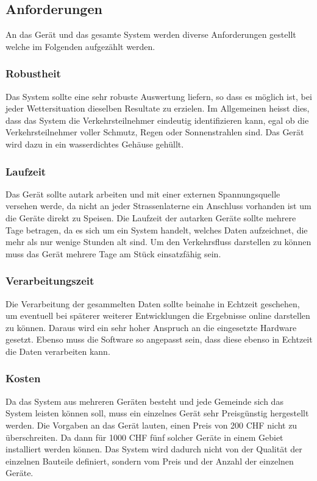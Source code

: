 \subsection{Anforderungen}
An das Gerät und das gesamte System werden diverse Anforderungen gestellt welche im Folgenden aufgezählt werden.

\subsubsection{Robustheit}
Das System sollte eine sehr robuste Auswertung liefern, so dass es möglich ist, bei jeder Wettersituation dieselben Resultate zu erzielen. Im Allgemeinen heisst dies, dass das System die Verkehrsteilnehmer eindeutig identifizieren kann, egal ob die Verkehrsteilnehmer voller Schmutz, Regen oder Sonnenstrahlen sind. Das Gerät wird dazu in ein wasserdichtes Gehäuse gehüllt. 

\subsubsection{Laufzeit}
Das Gerät sollte autark arbeiten und mit einer externen Spannungsquelle versehen werde, da nicht an jeder Strassenlaterne ein Anschluss vorhanden ist um die Geräte direkt zu Speisen. Die Laufzeit der autarken Geräte sollte mehrere Tage betragen, da es sich um ein System handelt, welches Daten aufzeichnet, die mehr als nur wenige Stunden alt sind. Um den Verkehrsfluss darstellen zu können muss das Gerät mehrere Tage am Stück einsatzfähig sein.

\subsubsection{Verarbeitungszeit}
Die Verarbeitung der gesammelten Daten sollte beinahe in Echtzeit geschehen, um eventuell bei späterer weiterer Entwicklungen die Ergebnisse online darstellen zu können. Daraus wird ein sehr hoher Anspruch an die eingesetzte Hardware gesetzt. Ebenso muss die Software so angepasst sein, dass diese ebenso in Echtzeit die Daten verarbeiten kann.

\subsubsection{Kosten}
Da das System aus mehreren Geräten besteht und jede Gemeinde sich das System leisten können soll, muss ein einzelnes Gerät sehr Preisgünstig hergestellt werden. Die Vorgaben an das Gerät lauten, einen Preis von 200 CHF nicht zu überschreiten. Da dann für 1000 CHF fünf solcher Geräte in einem Gebiet installiert werden können. Das System wird dadurch nicht von der Qualität der einzelnen Bauteile definiert, sondern vom Preis und der Anzahl der einzelnen Geräte.
